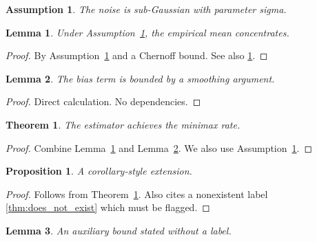 \documentclass{article}
\newtheorem{theorem}{Theorem}
\newtheorem{lemma}{Lemma}
\newtheorem{proposition}{Proposition}
\newtheorem{assumption}{Assumption}
\begin{document}
\begin{assumption}\label{ass:subgauss}
The noise is sub-Gaussian with parameter sigma.
\end{assumption}

\begin{lemma}\label{lem:concentration}
Under Assumption~\ref{ass:subgauss}, the empirical mean concentrates.
\end{lemma}
\begin{proof}
By Assumption~\ref{ass:subgauss} and a Chernoff bound. See also \ref{ass:subgauss}.
\end{proof}

\begin{lemma}\label{lem:bias}
The bias term is bounded by a smoothing argument.
\end{lemma}
\begin{proof}
Direct calculation. No dependencies.
\end{proof}

\begin{theorem}\label{thm:rate}
The estimator achieves the minimax rate.
\end{theorem}
\begin{proof}
Combine Lemma~\ref{lem:concentration} and Lemma~\ref{lem:bias}.
We also use Assumption~\ref{ass:subgauss}.
\end{proof}

\begin{proposition}\label{prop:extra}
A corollary-style extension.
\end{proposition}
\begin{proof}
Follows from Theorem~\ref{thm:rate}. Also cites a nonexistent label
\ref{thm:does_not_exist} which must be flagged.
\end{proof}

\begin{lemma}
An auxiliary bound stated without a label.
\end{lemma}
\end{document}
